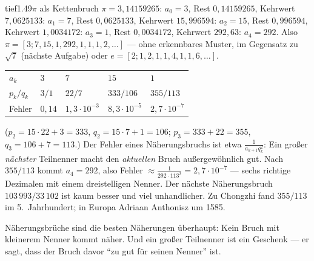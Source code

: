 \begin{loesungkarte}{tief}{1.49}{$\pi$ als Kettenbruch}
$\pi = 3{,}14159265$: $a_0 = 3$, Rest $0{,}14159265$, Kehrwert $7{,}0625133$: $a_1 = 7$, Rest $0{,}0625133$, Kehrwert $15{,}996594$: $a_2 = 15$, Rest $0{,}996594$, Kehrwert $1{,}0034172$: $a_3 = 1$, Rest $0{,}0034172$, Kehrwert $292{,}63$: $a_4 = 292$. Also $\pi = [3; 7, 15, 1, 292, 1, 1, 1, 2, \dots]$ --- ohne erkennbares Muster, im Gegensatz zu $\sqrt7$ (nächste Aufgabe) oder $e = [2; 1, 2, 1, 1, 4, 1, 1, 6, \dots]$.
\begin{center}
{\small\renewcommand{\arraystretch}{1.3}
\begin{tabular}{@{}lllll@{}}
$a_k$ & $3$ & $7$ & $15$ & $1$\\
$p_k/q_k$ & $3/1$ & $22/7$ & $333/106$ & $355/113$\\
Fehler & $0{,}14$ & $1{,}3\cdot10^{-3}$ & $8{,}3\cdot10^{-5}$ & $2{,}7\cdot10^{-7}$\\
\end{tabular}}
\end{center}
($p_2 = 15\cdot22 + 3 = 333$, $q_2 = 15\cdot7 + 1 = 106$; $p_3 = 333 + 22 = 355$, $q_3 = 106 + 7 = 113$.)
Der Fehler eines Näherungsbruchs ist etwa $\frac1{a_{k+1}q_k^{2}}$: Ein großer \emph{nächster} Teilnenner macht den \emph{aktuellen} Bruch außergewöhnlich gut. Nach $355/113$ kommt $a_4 = 292$, also Fehler $\approx\frac1{292\cdot113^{2}} = 2{,}7\cdot10^{-7}$ --- sechs richtige Dezimalen mit einem dreistelligen Nenner. Der nächste Näherungsbruch $103\,993/33\,102$ ist kaum besser und viel unhandlicher. Zu Chongzhi fand $355/113$ im 5.\ Jahrhundert; in Europa Adriaan Anthonisz um 1585.
\begin{mitnehmen}\kastentext
Näherungsbrüche sind die besten Näherungen überhaupt: Kein Bruch mit kleinerem Nenner kommt näher. Und ein großer Teilnenner ist ein Geschenk --- er sagt, dass der Bruch davor \enquote{zu gut für seinen Nenner} ist.
\end{mitnehmen}
\end{loesungkarte}

